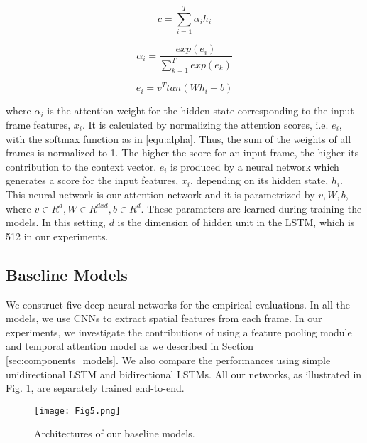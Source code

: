 \documentclass[11pt, a4paper, singlecolumn]{article}
\begin{document}
\begin{equation}
\label{equ:c}
c =\sum_{i=1}^{T}{\alpha}_i h_i
\end{equation}

\begin{equation}
\label{equ:alpha}
{\alpha}_i=\frac{exp(e_i)}{\sum_{k=1}^{T}{exp(e_k)}}
\end{equation}

\begin{equation}
\label{equ:e}
e_i=v^T tan(W h_i + b)
\end{equation}

where ${\alpha}_i$ is the attention weight for the hidden state corresponding to the input frame features, $x_i$. It is calculated by normalizing the attention scores, i.e. $e_i$, with the softmax function as in \eqref{equ:alpha}. Thus, the sum of the weights of all frames is normalized to 1. The higher the score for an input frame, the higher its contribution to the context vector. $e_i$ is produced by a neural network which generates a score for the input features, $x_i$, depending on its hidden state, $h_i$. This neural network is our attention network and it is parametrized by $v, W, b$, where $v {\in} R^d,  W{\in} R^{dxd}, b {\in} R^d$. These parameters are learned during training the models. In this setting, $d$ is the dimension of hidden unit in the LSTM, which is 512 in our experiments.


\subsection{Baseline Models}
\label{sec:baseline_models}

We construct five deep neural networks for the empirical evaluations. In all the models, we use CNNs to extract spatial features from each frame. In our experiments, we investigate the contributions of using a feature pooling module and temporal attention model as we described in Section \ref{sec:components_models}. We also compare the performances using simple unidirectional LSTM and bidirectional LSTMs. All our networks, as illustrated in Fig. \ref{fig5}, are separately trained end-to-end.  

\begin{figure}
	\centering
	\texttt{[image: Fig5.png]}
	\caption{Architectures of our baseline models.}
	\label{fig5}
\end{figure}
\end{document}
